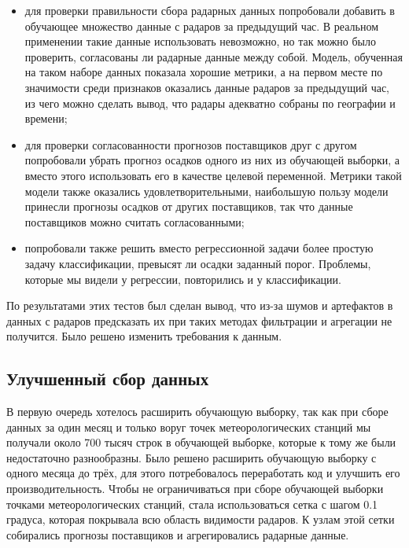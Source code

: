 \documentclass[14pt]{matmex-diploma}
\begin{document}
\begin{itemize}
    \item для проверки правильности сбора радарных данных попробовали добавить в обучающее множество данные с радаров за предыдущий час. В реальном применении такие данные использовать невозможно, но так можно было проверить, согласованы ли радарные данные между собой. Модель, обученная на таком наборе данных показала хорошие метрики, а на первом месте по значимости среди признаков оказались данные радаров за предыдущий час, из чего можно сделать вывод, что радары адекватно собраны по географии и времени;
    \item для проверки согласованности прогнозов поставщиков друг с другом попробовали убрать прогноз осадков одного из них из обучающей выборки, а вместо этого использовать его в качестве целевой переменной. Метрики такой модели также оказались удовлетворительными, наибольшую пользу модели принесли прогнозы осадков от других поставщиков, так что данные поставщиков можно считать согласованными;
    \item попробовали также решить вместо регрессионной задачи более простую задачу классификации, превысят ли осадки заданный порог. Проблемы, которые мы видели у регрессии, повторились и у классификации.
\end{itemize}


По результатами этих тестов был сделан вывод, что из-за шумов и артефактов в данных с радаров предсказать их при таких методах фильтрации и агрегации не получится. Было решено изменить требования к данным.


\subsection{Улучшенный сбор данных}

В первую очередь хотелось расширить обучающую выборку, так как при сборе данных за один месяц и только воруг точек метеорологических станций мы получали около 700 тысяч строк в обучающей выборке, которые к тому же были недостаточно разнообразны. Было решено  расширить обучающую выборку с одного месяца до трёх, для этого потребовалось переработать код и улучшить его производительность. Чтобы не ограничиваться при сборе обучающей выборки точками метеорологических станций, стала использоваться сетка с шагом 0.1 градуса, которая покрывала всю область видимости радаров. К узлам этой сетки собирались прогнозы поставщиков и агрегировались радарные данные.
\end{document}
